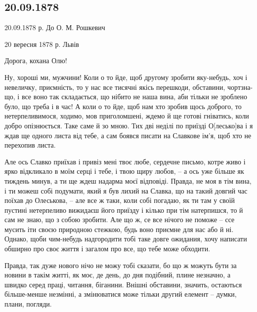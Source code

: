  
 
 
 
 

\subsection{20.09.1878}

20.09.1878 р. До О. М. Рошкевич       

20 вересня 1878 р. Львів                    

Дорога, кохана Олю!                         

Ну, хороші ми, мужчини! Коли о то йде, щоб другому зробити яку-небудь, хоч і
невеличку, приємність, то у нас все тисячні якісь перешкоди, обставини,
чортзна-що, і все воно так складається, що нібито не наша вина, аби тільки не
зроблено було, що треба і в час! А коли о то йде, щоб нам хто зробив щось
доброго, то нетерпеливимося, ходимо, мов приголомшені, ждемо й ще готові
гніватись, коли добро опізнюється. Таке саме й зо мною. Тих дві неділі по
приїзді О[лесько]ва і я ждав ще одного листа від тебе, а сам боявся писати на
Славкове ім’я, щоб хто не перехопив листа.

Але ось Славко приїхав і привіз мені твоє любе, сердечне письмо, котре живо і
ярко відкликало в моїм серці і тебе, і твою щиру любов, – а ось уже більше як
тиждень минув, а ти ще ждеш надарма моєї відповіді. Правда, не моя в тім вина,
і ти можеш собі подумати, який я був лихий на Славка, що на такий довгий час
поїхав до Олеськова, – але все ж таки, коли собі погадаю, як ти там у своїй
пустині нетерпеливо вижидаєш його приїзду і кілько при тім натерпишся, то й сам
не знаю, що з собою зробити. Але що ж, се все нічого не поможе – ссе мусить іти
своєю природною стежкою, будь воно приємне для нас або й ні. Однако, щоби
чим-небудь надгородити тобі таке довге ожидания, хочу написати обширно про своє
життя і загалом про все, що тебе може обходити.

Правда, так дуже нового нічо не можу тобі сказати, бо що ж можуть бути за
новини в такім житті, як моє, де день, до дня подібний, плине незначно, а
швидко серед праці, читання, біганини. Внішні обставини, значить, остаються
більше-менше незмінні, а змінюватися може тільки другий елемент – думки, плани,
погляди.

